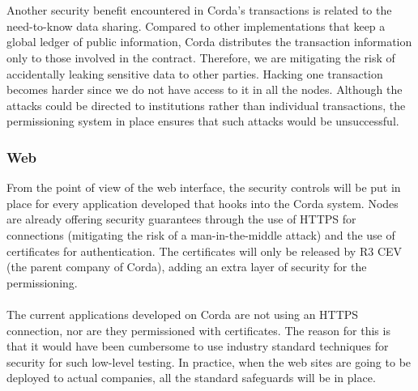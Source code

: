 \documentclass[12pt,twoside]{article}
\begin{document}
\\ \\
Another security benefit encountered in Corda's transactions is related to the need-to-know data sharing. Compared to other implementations that keep a global ledger of public information, Corda distributes the transaction information only to those involved in the contract. Therefore, we are mitigating the risk of accidentally leaking sensitive data to other parties. Hacking one transaction becomes harder since we do not have access to it in all the nodes. Although the attacks could be directed to institutions rather than individual transactions, the permissioning system in place ensures that such attacks would be unsuccessful.
\subsubsection{Web}
\label{sub:websec}
From the point of view of the web interface, the security controls will be put in place for every application developed that hooks into the Corda system. Nodes are already offering security guarantees through the use of HTTPS for connections (mitigating the risk of a man-in-the-middle attack) and the use of certificates for authentication. The certificates will only be released by R3 CEV (the parent company of Corda), adding an extra layer of security for the permissioning. 
\\ \\
The current applications developed on Corda are not using an HTTPS connection, nor are they permissioned with certificates. The reason for this is that it would have been cumbersome to use industry standard techniques for security for such low-level testing. In practice, when the web sites are going to be deployed to actual companies, all the standard safeguards will be in place. 
\end{document}
